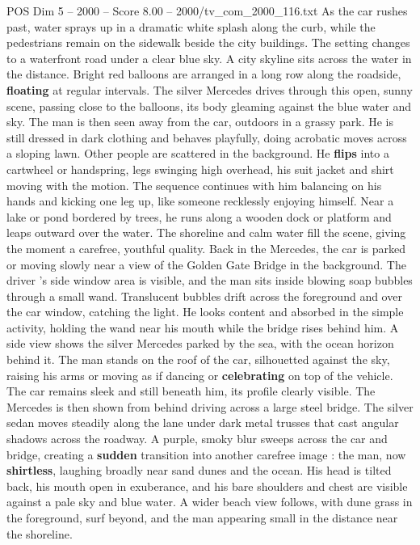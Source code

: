 \begin{textsample}{POS Dim 5 – 2000 – Score 8.00 – 2000/tv\_com\_2000\_116.txt}
As the car rushes past, water sprays up in a dramatic white splash along the curb, while the pedestrians remain on the sidewalk beside the city buildings.
The setting changes to a waterfront road under a clear blue sky.
A city skyline sits across the water in the distance.
Bright red balloons are arranged in a long row along the roadside, \textbf{floating} at regular intervals.
The silver Mercedes drives through this open, sunny scene, passing close to the balloons, its body gleaming against the blue water and sky.
The man is then seen away from the car, outdoors in a grassy park.
He is still dressed in dark clothing and behaves playfully, doing acrobatic moves across a sloping lawn.
Other people are scattered in the background.
He \textbf{flips} into a cartwheel or handspring, legs swinging high overhead, his suit jacket and shirt moving with the motion.
The sequence continues with him balancing on his hands and kicking one leg up, like someone recklessly enjoying himself.
Near a lake or pond bordered by trees, he runs along a wooden dock or platform and leaps outward over the water.
The shoreline and calm water fill the scene, giving the moment a carefree, youthful quality.
Back in the Mercedes, the car is parked or moving slowly near a view of the Golden Gate Bridge in the background.
The driver ’s side window area is visible, and the man sits inside blowing soap bubbles through a small wand.
Translucent bubbles drift across the foreground and over the car window, catching the light.
He looks content and absorbed in the simple activity, holding the wand near his mouth while the bridge rises behind him.
A side view shows the silver Mercedes parked by the sea, with the ocean horizon behind it.
The man stands on the roof of the car, silhouetted against the sky, raising his arms or moving as if dancing or \textbf{celebrating} on top of the vehicle.
The car remains sleek and still beneath him, its profile clearly visible.
The Mercedes is then shown from behind driving across a large steel bridge.
The silver sedan moves steadily along the lane under dark metal trusses that cast angular shadows across the roadway.
A purple, smoky blur sweeps across the car and bridge, creating a \textbf{sudden} transition into another carefree image : the man, now \textbf{shirtless}, laughing broadly near sand dunes and the ocean.
His head is tilted back, his mouth open in exuberance, and his bare shoulders and chest are visible against a pale sky and blue water.
A wider beach view follows, with dune grass in the foreground, surf beyond, and the man appearing small in the distance near the shoreline.

\end{textsample}
